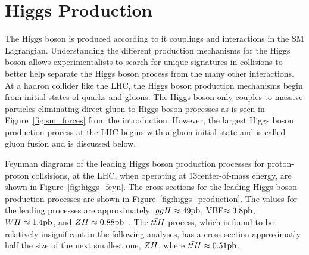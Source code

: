 \section{Higgs Production}
The Higgs boson is produced according to it couplings and interactions in the SM
Lagrangian. Understanding the different production mechanisms for the Higgs boson
allows experimentalists to search for unique signatures in collisions to better
help separate the Higgs boson process from the many other interactions.
At a hadron collider like the LHC, the Higgs boson production
mechanisms begin from initial states of quarks and gluons. The Higgs boson
only couples to massive particles eliminating direct gluon to Higgs boson processes
as is seen in Figure~\ref{fig:sm_forces} from the introduction.
However, the largest Higgs boson production process at the LHC begins with a gluon
initial state and is called gluon fusion and is discussed below.

Feynman diagrams of the leading Higgs boson production processes for
proton-proton collsisions, at the LHC, when operating at 13\TeV center-of-mass energy,
are shown in Figure~\ref{fig:higgs_feyn}. 
The cross sections for the leading Higgs boson production processes
are shown in Figure~\ref{fig:higgs_production}. The values for the leading
processes are approximately: $ggH \approx 49\mathrm{pb}$, VBF$ \approx 3.8\mathrm{pb}$, $WH \approx 1.4\mathrm{pb}$,
and $ZH \approx 0.88\mathrm{pb}$~\cite{deFlorian:2016spz}. The $t\bar{t}H$ process,
which is found to be relatively insignificant in the following analyses, has a cross
section approximatly half the size of the next smallest one, $ZH$, where
$t\bar{t}H \approx 0.51\mathrm{pb}$.


